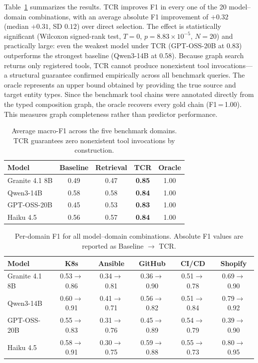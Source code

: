 \documentclass{article}
\begin{document}
Table~\ref{tab:main} summarizes the results. TCR improves F1 in every one of the 20 model--domain combinations, with an average absolute F1 improvement of $+0.32$ (median $+0.31$, SD $0.12$) over direct selection. The effect is statistically significant (Wilcoxon signed-rank test, $T{=}0$, $p = 8.83 \times 10^{-5}$, $N{=}20$) and practically large: even the weakest model under TCR (GPT-OSS-20B at 0.83) outperforms the strongest baseline (Qwen3-14B at 0.58). Because graph search returns only registered tools, TCR cannot produce nonexistent tool invocations---a structural guarantee confirmed empirically across all benchmark queries. The oracle represents an upper bound obtained by providing the true source and target entity types. Since the benchmark tool chains were annotated directly from the typed composition graph, the oracle recovers every gold chain (F1\,=\,1.00). This measures graph completeness rather than predictor performance.

\begin{table}[htbp]
  \centering
  \caption{Average macro-F1 across the five benchmark domains. TCR guarantees zero nonexistent tool invocations by construction.}
  \label{tab:main}
  \begin{tabular}{lcccc}
    \toprule
    \textbf{Model} & \textbf{Baseline} & \textbf{Retrieval} & \textbf{TCR} & \textbf{Oracle} \\
    \midrule
    Granite 4.1 8B  & 0.49 & 0.47 & \textbf{0.85} & 1.00 \\
    Qwen3-14B       & 0.58 & 0.58 & \textbf{0.84} & 1.00 \\
    GPT-OSS-20B     & 0.45 & 0.53 & \textbf{0.83} & 1.00 \\
    Haiku 4.5       & 0.56 & 0.57 & \textbf{0.84} & 1.00 \\
    \bottomrule
  \end{tabular}
\end{table}

\begin{table}[htbp]
  \centering
  \caption{Per-domain F1 for all model--domain combinations. Absolute F1 values are reported as Baseline $\rightarrow$ TCR.}
  \label{tab:perdomain}
  \small
  \begin{tabular}{lccccc}
    \toprule
    \textbf{Model} & \textbf{K8s} & \textbf{Ansible} & \textbf{GitHub} & \textbf{CI/CD} & \textbf{Shopify} \\
    \midrule
    Granite 4.1 8B  & 0.53$\to$0.86 & 0.34$\to$0.81 & 0.36$\to$0.90 & 0.51$\to$0.78 & 0.69$\to$0.90 \\
    Qwen3-14B       & 0.60$\to$0.91 & 0.41$\to$0.71 & 0.56$\to$0.82 & 0.51$\to$0.84 & 0.79$\to$0.92 \\
    GPT-OSS-20B     & 0.55$\to$0.83 & 0.31$\to$0.76 & 0.45$\to$0.89 & 0.54$\to$0.79 & 0.39$\to$0.90 \\
    Haiku 4.5       & 0.58$\to$0.91 & 0.30$\to$0.75 & 0.59$\to$0.88 & 0.55$\to$0.73 & 0.80$\to$0.95 \\
    \bottomrule
  \end{tabular}
\end{table}
\end{document}
